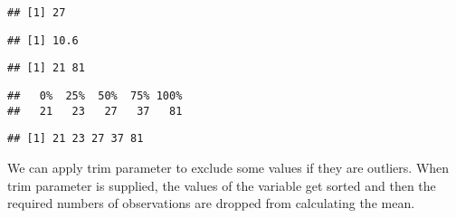 \documentclass[]{book}
\newenvironment{Shaded}{\begin{snugshade}}{\end{snugshade}}
\newcommand{\KeywordTok}[1]{\textcolor[rgb]{0.13,0.29,0.53}{\textbf{#1}}}
\newcommand{\DataTypeTok}[1]{\textcolor[rgb]{0.13,0.29,0.53}{#1}}
\newcommand{\FloatTok}[1]{\textcolor[rgb]{0.00,0.00,0.81}{#1}}
\newcommand{\CommentTok}[1]{\textcolor[rgb]{0.56,0.35,0.01}{\textit{#1}}}
\newcommand{\OperatorTok}[1]{\textcolor[rgb]{0.81,0.36,0.00}{\textbf{#1}}}
\newcommand{\NormalTok}[1]{#1}
\theoremstyle{definition}
\theoremstyle{definition}
\theoremstyle{definition}
\theoremstyle{remark}
\begin{document}
\begin{verbatim}
## [1] 27
\end{verbatim}

\begin{Shaded}
\end{Shaded}

\begin{verbatim}
## [1] 10.6
\end{verbatim}

\begin{Shaded}
\end{Shaded}

\begin{verbatim}
## [1] 21 81
\end{verbatim}

\begin{Shaded}
\end{Shaded}

\begin{verbatim}
##   0%  25%  50%  75% 100% 
##   21   23   27   37   81
\end{verbatim}

\begin{Shaded}
\end{Shaded}

\begin{verbatim}
## [1] 21 23 27 37 81
\end{verbatim}

We can apply trim parameter to exclude some values if they are outliers.
When trim parameter is supplied, the values of the variable get sorted
and then the required numbers of observations are dropped from
calculating the mean.

\begin{Shaded}
\end{Shaded}
\end{document}
